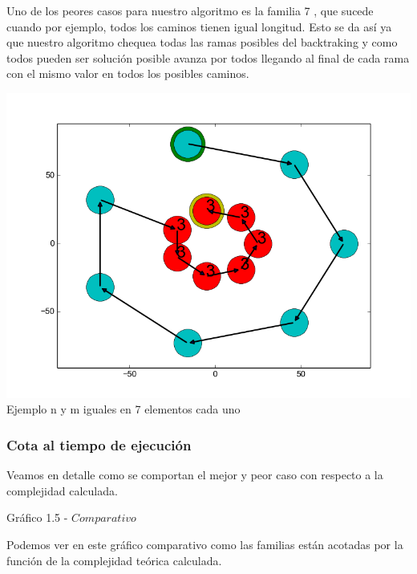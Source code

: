 Uno de los peores casos para nuestro algoritmo es la familia 7 , que sucede cuando por ejemplo, todos los caminos tienen igual longitud. Esto se da as\'i ya que nuestro algoritmo chequea todas las ramas posibles del backtraking y como todos pueden ser soluci\'on posible avanza por todos llegando al final de cada rama con el mismo valor en todos los posibles caminos.\\

\vspace*{0.3cm} \vspace*{0.3cm}
  \begin{center}
 \includegraphics[scale=0.65]{./EJ1/anilloexacto.png}
 {Ejemplo n y m iguales en 7 elementos cada uno}
  \end{center}
  \vspace*{0.3cm}


 \subsubsection*{Cota al tiempo de ejecución}


Veamos en detalle como se comportan el mejor y peor caso con respecto a la complejidad calculada.\\

  \vspace*{0.3cm} \vspace*{0.3cm}
  \begin{center}
{Gr\'afico 1.5 - $Comparativo$}
  \end{center}
  \vspace*{0.3cm}

Podemos ver en este gr\'afico comparativo como las familias est\'an acotadas por la funci\'on de la complejidad te\'orica calculada.\\



